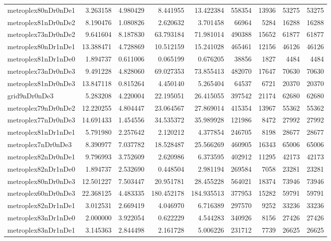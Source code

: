 \begin{longtable}{|l|r|r|r|r|r|r|r|r|}
metroplex80nDr0nDe1 & 3.263158 & 4.980429 & 8.441955 & 13.422384 & 558354 & 13936 & 53275 & 53275 \\
metroplex81nDr0nDe2 & 8.190476 & 1.080826 & 2.620632 & 3.701458 & 66964 & 5284 & 16288 & 16288 \\
metroplex73nDr0nDe2 & 9.641604 & 8.187830 & 63.793184 & 71.981014 & 490388 & 15652 & 61877 & 61877 \\
metroplex80nDr1nDe1 & 13.388471 & 4.728869 & 10.512159 & 15.241028 & 465461 & 12156 & 46126 & 46126 \\
metroplex81nDr1nDe0 & 1.894737 & 0.611006 & 0.065199 & 0.676205 & 38856 & 1827 & 4484 & 4484 \\
metroplex73nDr0nDe3 & 9.491228 & 4.828060 & 69.027353 & 73.855413 & 482070 & 17647 & 70630 & 70630 \\
metroplex81nDr0nDe3 & 13.847118 & 0.815264 & 4.450140 & 5.265404 & 64537 & 6721 & 20370 & 20370 \\
grid9nDr0nDe3 & 5.283208 & 4.220004 & 22.195051 & 26.415055 & 397542 & 21174 & 62680 & 62680 \\
metroplex79nDr0nDe2 & 12.220255 & 4.804447 & 23.064567 & 27.869014 & 415354 & 13967 & 55362 & 55362 \\
metroplex77nDr0nDe3 & 14.691433 & 1.454556 & 34.535372 & 35.989928 & 121986 & 8472 & 27992 & 27992 \\
metroplex81nDr1nDe1 & 5.791980 & 2.257642 & 2.120212 & 4.377854 & 246705 & 8198 & 28677 & 28677 \\
metroplex7nDr0nDe3 & 8.390977 & 7.037782 & 18.528487 & 25.566269 & 460905 & 16343 & 65006 & 65006 \\
metroplex82nDr0nDe1 & 9.796993 & 3.752609 & 2.620986 & 6.373595 & 402912 & 11295 & 42173 & 42173 \\
metroplex82nDr1nDe0 & 1.894737 & 2.532690 & 0.448504 & 2.981194 & 269584 & 7058 & 23281 & 23281 \\
metroplex80nDr0nDe3 & 12.501227 & 7.503447 & 20.951781 & 28.455228 & 564021 & 18374 & 73946 & 73946 \\
metroplex60nDr0nDe3 & 22.368125 & 4.483335 & 180.452178 & 184.935513 & 377953 & 15282 & 59791 & 59791 \\
metroplex82nDr1nDe1 & 3.012531 & 2.669419 & 4.046970 & 6.716389 & 297570 & 9252 & 33236 & 33236 \\
metroplex83nDr1nDe0 & 2.000000 & 3.922054 & 0.622229 & 4.544283 & 340926 & 8156 & 27426 & 27426 \\
metroplex83nDr1nDe1 & 3.145363 & 2.844498 & 2.161728 & 5.006226 & 231712 & 7739 & 26625 & 26625 \\

\end{longtable}
